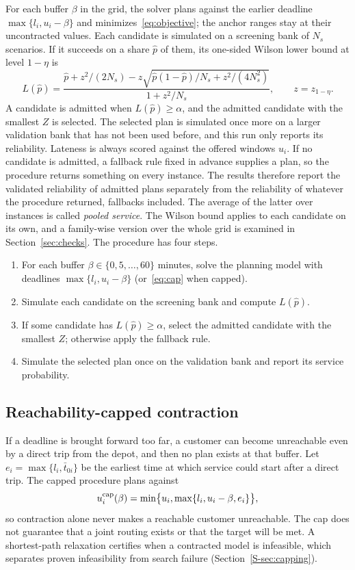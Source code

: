 \documentclass{itor}
\newcommand{\SI}[1]{Section~\ref{S-#1}}
\begin{document}
For each buffer $\beta$ in the grid, the solver plans against the earlier
deadline $\max\{l_i,u_i-\beta\}$ and minimizes~\eqref{eq:objective}; the anchor
ranges stay at their uncontracted values. Each candidate is simulated on a
screening bank of $N_s$ scenarios. If it succeeds on a share $\hat p$ of them,
its one-sided Wilson lower bound at level $1-\eta$ is
\begin{equation}
 L(\hat p)=\frac{\hat p+z^2/(2N_s)-z\sqrt{\hat p(1-\hat p)/N_s+z^2/(4N_s^2)}}{1+z^2/N_s},
 \qquad z=z_{1-\eta}.                                          \label{eq:wilson}
\end{equation}
A candidate is admitted when $L(\hat p)\geq\alpha$, and the admitted candidate
with the smallest $Z$ is selected. The selected plan is simulated once more on a
larger validation bank that has not been used before, and this run only reports
its reliability. Lateness is always scored against the offered windows $u_i$.
If no candidate is admitted, a fallback rule fixed in advance supplies a plan,
so the procedure returns something on every instance. The results therefore
report the validated reliability of admitted plans separately from the
reliability of whatever the procedure returned, fallbacks included. The average
of the latter over instances is called \emph{pooled service}. The Wilson
bound applies to each candidate on its own, and a family-wise version over the
whole grid is examined in Section~\ref{sec:checks}. The procedure has four
steps.
\begin{enumerate}
\item For each buffer $\beta\in\{0,5,\ldots,60\}$ minutes, solve the planning
model with deadlines $\max\{l_i,u_i-\beta\}$ (or~\eqref{eq:cap} when capped).
\item Simulate each candidate on the screening bank and compute $L(\hat p)$.
\item If some candidate has $L(\hat p)\geq\alpha$, select the admitted
candidate with the smallest $Z$; otherwise apply the fallback rule.
\item Simulate the selected plan once on the validation bank and report its
service probability.
\end{enumerate}

\subsection{Reachability-capped contraction}

If a deadline is brought forward too far, a customer can become unreachable even
by a direct trip from the depot, and then no plan exists at that buffer. Let
$e_i=\max\{l_i,\bar t_{0i}\}$ be the earliest time at which service could start
after a direct trip. The capped procedure plans against
\begin{equation}
 u_i^{\rm cap}(\beta)=\min\bigl\{u_i,\max\{l_i,u_i-\beta,e_i\}\bigr\},
 \label{eq:cap}
\end{equation}
so contraction alone never makes a reachable customer unreachable. The cap does
not guarantee that a joint routing exists or that the target will be met. A
shortest-path relaxation certifies when a contracted model is infeasible, which
separates proven infeasibility from search failure (\SI{sec:capping}).
\end{document}
